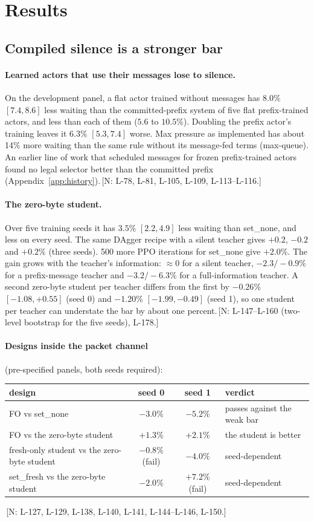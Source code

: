 \documentclass[11pt]{article}
\theoremstyle{definition}
\newif\ifshownotes\shownotestrue
\newcommand{\NOTE}[1]{\ifshownotes{\color{notecol}\,\textsf{\footnotesize[N: #1]}}\fi}
\begin{document}
\section{Results}\label{sec:results}
\subsection{Compiled silence is a stronger bar}\label{sec:res-bar}
\paragraph{Learned actors that use their messages lose to silence.} On the development panel, a flat actor trained without
messages has $8.0\%$ $[7.4,8.6]$ less waiting than the committed-prefix system of five flat prefix-trained actors, and less
than each of them ($5.6$ to $10.5\%$). Doubling the prefix actor's training leaves it $6.3\%$ $[5.3,7.4]$ worse. Max pressure
as implemented has about 14\% more waiting than the same rule without its message-fed terms (max-queue). An earlier line of
work that scheduled messages for frozen prefix-trained actors found no legal selector better than the committed prefix
(Appendix~\ref{app:history}).\NOTE{L-78, L-81, L-105, L-109, L-113--L-116.}
\paragraph{The zero-byte student.} Over five training seeds it has $3.5\%$ $[2.2,4.9]$ less waiting than set\_none, and less on
every seed. The same DAgger recipe with a silent teacher gives $+0.2$, $-0.2$ and $+0.2\%$ (three seeds). 500 more PPO
iterations for set\_none give $+2.0\%$. The gain grows with the teacher's information: $\approx0$ for a silent teacher,
$-2.3/-0.9\%$ for a prefix-message teacher and $-3.2/-6.3\%$ for a full-information teacher. A second zero-byte student per
teacher differs from the first by $-0.26\%$ $[-1.08,+0.55]$ (seed 0) and $-1.20\%$ $[-1.99,-0.49]$ (seed 1), so one student
per teacher can understate the bar by about one percent.\NOTE{L-147--L-160 (two-level bootstrap for the five seeds), L-178.}
\paragraph{Designs inside the packet channel} (pre-specified panels, both seeds required):
\begin{center}\small
\begin{tabular}{@{}lccl@{}}
\toprule
design & seed 0 & seed 1 & verdict\\
\midrule
FO vs set\_none & $-3.0\%$ & $-5.2\%$ & passes against the weak bar\\
FO vs the zero-byte student & $+1.3\%$ & $+2.1\%$ & the student is better\\
fresh-only student vs the zero-byte student & $-0.8\%$ (fail) & $-4.0\%$ & seed-dependent\\
set\_fresh vs the zero-byte student & $-2.0\%$ & $+7.2\%$ (fail) & seed-dependent\\
\bottomrule
\end{tabular}
\end{center}
\NOTE{L-127, L-129, L-138, L-140, L-141, L-144--L-146, L-150.}
\end{document}
